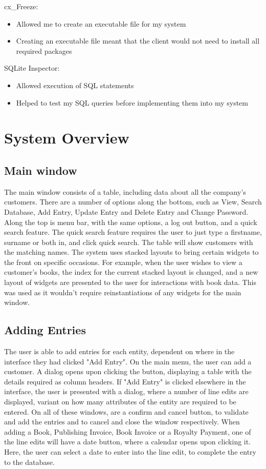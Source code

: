cx_Freeze:
\begin{itemize}
    \item Allowed me to create an executable file for my system
    \item Creating an executable file meant that the client would not need to install all required packages
\end{itemize}


SQLite Inspector:
\begin{itemize}
    \item Allowed execution of SQL statements
    \item Helped to test my SQL queries before implementing them into my system
\end{itemize}




\section{System Overview}

\subsection{Main window}

The main window consists of a table, including data about all the company's customers. There are a number of options along the bottom, such as View, Search Database, Add Entry, Update Entry and Delete Entry and Change Password. Along the top is  menu bar, with the same options, a log out button, and a quick search feature. The quick search feature requires the user to just type a firstname, surname or both in, and click quick search. The table will show customers with the matching names. The system uses stacked layouts to bring certain widgets to the front on specific occasions. For example, when the user wishes to view a customer's books, the index for the current stacked layout is changed, and a new layout of widgets are presented to the user for interactions with book data. This was used as it wouldn't require reinstantiations of any widgets for the main window.

\subsection{Adding Entries}

The user is able to add entries for each entity, dependent on where in the interface they had clicked "Add Entry". On the main menu, the user can add a customer. A dialog opens upon clicking the button, displaying a table with the details required as column headers. If "Add Entry" is clicked elsewhere in the interface, the user is presented with a dialog, where a number of line edits are displayed, variant on how many attributes of the entity are required to be entered. On all of these windows, are a confirm and cancel button, to  validate and add the entries and to cancel and close the window respectively. When adding a Book, Publishing Invoice, Book Invoice or a Royalty Payment, one of the line edits will have a date button, where a calendar opens upon clicking it. Here, the user can select a date to enter into the line edit, to complete the entry to the database.

